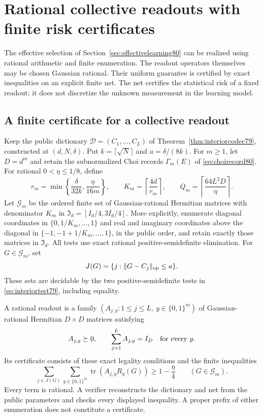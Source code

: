 \section{Rational collective readouts with finite risk certificates}
\label{sec:finiterisk81}

The effective selection of Section~\ref{sec:effectivelearning80}
can be realized using rational arithmetic and finite enumeration.
The readout operators themselves may be chosen Gaussian rational.
Their uniform guarantee is certified by exact inequalities on an
explicit finite net.  The net certifies the statistical risk of a
fixed readout; it does not discretize the unknown measurement in
the learning model.

\subsection{A finite certificate for a collective readout}
Keep the public dictionary
$\mathcal D=(C_1,\ldots,C_L)$ of
Theorem~\ref{thm:interiorcodec79}, constructed at $(d,N,\delta)$.
Put $k=\lceil\sqrt N\rceil$ and $a=\delta/(8k)$.
For $m\ge1$, let $D=d^m$ and retain the subnormalized Choi records
$\Gamma_m(E)$ of \eqref{eq:choirecord80}.
For rational $0<\eta\le1/8$, define
\begin{equation}\label{eq:certificateparameters81}
 r_m=\min\left\{\frac{\delta}{32k},\frac{\eta}{16m}\right\},
 \qquad
 K_m=\left\lceil\frac{4d}{r_m}\right\rceil,
 \qquad
 Q_m=\left\lceil\frac{64L^2D}{\eta}\right\rceil.
\end{equation}
Let $\mathcal G_m$ be the ordered finite set of Gaussian-rational
Hermitian matrices with denominator $K_m$ in
$\mathfrak I_d=[I_d/4,3I_d/4]$.  More explicitly, enumerate diagonal
coordinates in $\{0,1/K_m,\ldots,1\}$ and real and imaginary
coordinates above the diagonal in
$\{-1,-1+1/K_m,\ldots,1\}$, in the public order, and retain exactly
those matrices in $\mathfrak I_d$.
All tests use exact rational positive-semidefinite elimination.
For $G\in\mathcal G_m$, set
\[
 J(G)=\{j:\|G-C_j\|_{\rm op}\le a\}.
\]
These sets are decidable by the two positive-semidefinite tests in
\eqref{eq:interiortest79}, including equality.

A rational readout is a family
$(A_{j,y}:1\le j\le L,\ y\in\{0,1\}^m)$ of Gaussian-rational
Hermitian $D\times D$ matrices satisfying
\[
 A_{j,y}\succeq0,\qquad \sum_{j=1}^L A_{j,y}=I_D
 \quad\hbox{for every }y.
\]
Its certificate consists of these exact legality conditions and the
finite inequalities
\begin{equation}\label{eq:finitecertificate81}
 \sum_{j\in J(G)}\sum_{y\in\{0,1\}^m}
       \operatorname{tr}(A_{j,y}R_y(G))\ge1-\frac\eta4
 \qquad(G\in\mathcal G_m).
\end{equation}
Every term is rational.  A verifier reconstructs the dictionary and
net from the public parameters and checks every displayed inequality.
A proper prefix of either enumeration does not constitute a certificate.

